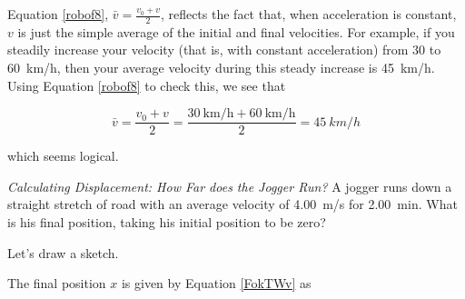 \documentclass[../../main-ap-physics.tex]{subfiles}
\begin{document}
Equation \eqref{robof8}, $\bar{v} = \frac{v_0 + v}{2}$, reflects the fact that, when acceleration is constant, $v$ is just the simple average of the initial and final velocities. For example, if you steadily increase your velocity (that is, with constant acceleration) from 30 to \SI{60}{km/h}, then your average velocity during this steady increase is \SI{45}{km/h}. Using Equation \eqref{robof8} to check this, we see that 

\begin{equation*}
    \bar{v} = \frac{v_0 + v}{2} = \frac{\SI[per-mode=fraction]{30}{\kilo\meter\per\hour} + \SI[per-mode=fraction]{60}{\kilo\meter\per\hour}}{2} = \SI{45}{km/h}
\end{equation*}

which seems logical.

\begin{example}
    \textit{Calculating Displacement: How Far does the Jogger Run?} A jogger runs down a straight stretch of road with an average velocity of \SI{4.00}{m/s} for \SI{2.00}{min}. What is his final position, taking his initial position to be zero?
\end{example}

\Solution Let's draw a sketch.

\begin{center}
\end{center}

The final position $x$ is given by Equation \eqref{FokTWv} as
\end{document}
